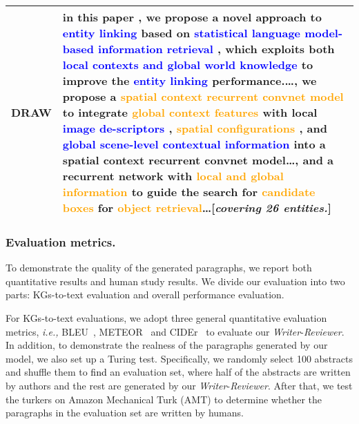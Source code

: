 \documentclass[letterpaper]{article}
\def\xgh{\textcolor{black}}
\def\hmg{\textcolor{black}}
\def\ie{\emph{i.e., }}
\begin{document}
\begin{table*}[t]
\begin{center}
\begin{tabular}{l p{15cm}}
		
  \\ 
		DRAW &  in this paper , we propose a novel approach to  \textcolor{blue}{entity linking} based on \textcolor{blue}{statistical language model-based information retrieval} , which exploits both \textcolor{blue}{local contexts and global world knowledge} to improve the \textcolor{blue}{entity linking} performance.\dots, we propose a \textcolor{orange}{spatial context recurrent convnet model} to integrate \textcolor{orange}{global context features} with local \textcolor{blue}{image de-scriptors} ,\textcolor{orange}{ spatial configurations} , and \textcolor{blue}{global scene-level contextual information} into a spatial context recurrent convnet model\dots, and a recurrent network with \textcolor{orange}{local and global information} to guide the search for \textcolor{orange}{candidate boxes} for \textcolor{orange}{object retrieval}\dots [\textit{covering 26 entities.}]
  \\ \bottomrule
	\end{tabular}
	\caption{ Example outputs of various models. \xgh{To better visualize the generated text, we omit information irrelevant to the comparisons.} Repetitive words are represented in \textcolor{red}{red} and entities included in KGs are represented in \textcolor{orange}{orange}. The potential knowledge is represented in \textcolor{blue}{blue} with the corresponding superscript.
	}
	\label{tab:example}
	\end{center}
\end{table*}

\subsubsection{Evaluation metrics.} 
To demonstrate the quality of the generated paragraphs, we report both quantitative results and human study results.
We divide our evaluation into two parts: KGs-to-text evaluation and overall performance evaluation.

For KGs-to-text evaluations, we adopt three general quantitative evaluation metrics, \ie BLEU~\cite{10.3115/1073083.1073135}, METEOR~\cite{Denkowski2014MeteorUL} and CIDEr~\cite{Vedantam2015CIDErCI} to 
evaluate our \textit{Writer}-\textit{Reviewer}. In addition, to demonstrate the realness of the paragraphs generated by our model,
we also set up a Turing test. Specifically, we randomly select 100 abstracts and shuffle them to \hmg{find} an evaluation set, where half of the abstracts are written by authors and the rest are generated by our \textit{Writer}-\textit{Reviewer}. 
After that, we test the turkers on Amazon Mechanical Turk (AMT) to determine whether the paragraphs in the evaluation set are written by humans.
\end{document}
